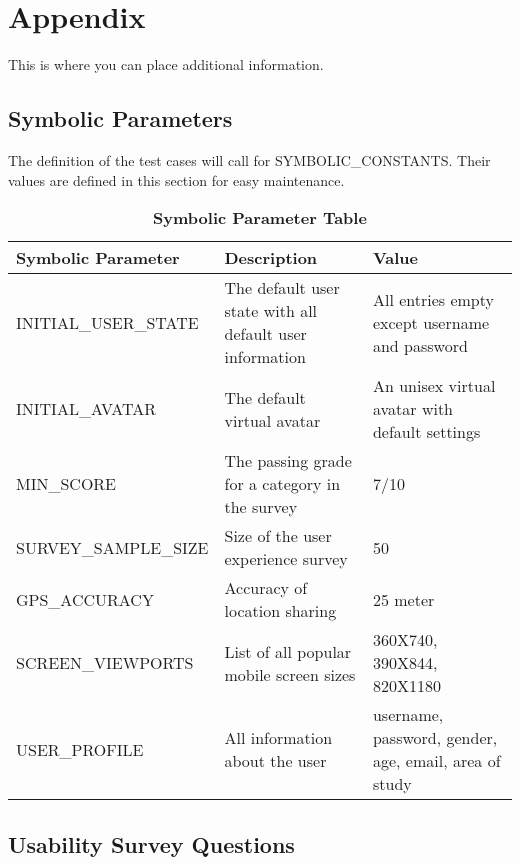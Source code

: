 \documentclass[12pt, titlepage]{article}
\begin{document}
\section{Appendix}

This is where you can place additional information.

\subsection{Symbolic Parameters}

The definition of the test cases will call for SYMBOLIC\_CONSTANTS.
Their values are defined in this section for easy maintenance.

\begin{table}[h]
\caption{\bf Symbolic Parameter Table}
\begin{tabular}{|p{0.4\linewidth} | p{0.3\linewidth}| p{0.3\linewidth} |}
\hline
\multicolumn{1}{|l}{\bfseries Symbolic Parameter} & \multicolumn{1}{|l|}{\bfseries Description} & \multicolumn{1}{l|}{\bfseries Value}\\
\hline
INITIAL\_USER\_STATE & The default user state with all default user information & All entries empty except username and password \\
\hline
INITIAL\_AVATAR & The default virtual avatar & An unisex virtual avatar with default settings \\
\hline
MIN\_SCORE & The passing grade for a category in the survey & 7/10\\
\hline
SURVEY\_SAMPLE\_SIZE & Size of the user experience survey & 50\\
\hline
GPS\_ACCURACY & Accuracy of location sharing & 25 meter\\
\hline
SCREEN\_VIEWPORTS & List of all popular mobile screen sizes & 360X740, 390X844, 820X1180\\
\hline
USER\_PROFILE & All information about the user & username, password, gender, age, email, area of study\\
\hline
\end{tabular}
\end{table}

\subsection{Usability Survey Questions}
\label{sec:survey}
\end{document}
